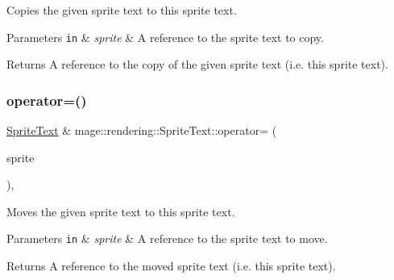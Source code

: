 Copies the given sprite text to this sprite text.


\begin{DoxyParams}[1]{Parameters}
\mbox{\tt in}  & {\em sprite} & A reference to the sprite text to copy. \\
\hline
\end{DoxyParams}
\begin{DoxyReturn}{Returns}
A reference to the copy of the given sprite text (i.\+e. this sprite text). 
\end{DoxyReturn}
\mbox{\label{classmage_1_1rendering_1_1_sprite_text_a8ced44509f1fa84236b20f1d42add873}} 
\subsubsection{\texorpdfstring{operator=()}{operator=()}\hspace{0.1cm}{\footnotesize\ttfamily [2/2]}}
{\footnotesize\ttfamily \mbox{\hyperlink{classmage_1_1rendering_1_1_sprite_text}{Sprite\+Text}} \& mage\+::rendering\+::\+Sprite\+Text\+::operator= (\begin{DoxyParamCaption}\item[{\mbox{\hyperlink{classmage_1_1rendering_1_1_sprite_text}{Sprite\+Text}} \&\&}]{sprite }\end{DoxyParamCaption})\hspace{0.3cm}{\ttfamily [default]}, {\ttfamily [noexcept]}}

Moves the given sprite text to this sprite text.


\begin{DoxyParams}[1]{Parameters}
\mbox{\tt in}  & {\em sprite} & A reference to the sprite text to move. \\
\hline
\end{DoxyParams}
\begin{DoxyReturn}{Returns}
A reference to the moved sprite text (i.\+e. this sprite text). 
\end{DoxyReturn}
\mbox{\label{classmage_1_1rendering_1_1_sprite_text_acad93e0803d47502db5ef16998d2f38a}} 
